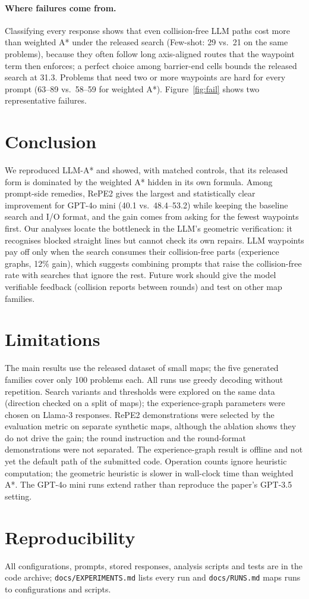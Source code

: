 \documentclass[11pt]{article}
\begin{document}
\paragraph{Where failures come from.}
Classifying every response shows that even collision-free LLM paths cost more than weighted A* under the released search (Few-shot: 29 vs.\ 21 on the same problems), because they often follow long axis-aligned routes that the waypoint term then enforces; a perfect choice among barrier-end cells bounds the released search at 31.3.
Problems that need two or more waypoints are hard for every prompt (63--89 vs.\ 58--59 for weighted A*).
Figure~\ref{fig:fail} shows two representative failures.

\section{Conclusion}
We reproduced LLM-A* and showed, with matched controls, that its released form is dominated by the weighted A* hidden in its own formula.
Among prompt-side remedies, RePE2 gives the largest and statistically clear improvement for GPT-4o mini (40.1 vs.\ 48.4--53.2) while keeping the baseline search and I/O format, and the gain comes from asking for the fewest waypoints first.
Our analyses locate the bottleneck in the LLM's geometric verification: it recognises blocked straight lines but cannot check its own repairs.
LLM waypoints pay off only when the search consumes their collision-free parts (experience graphs, 12\% gain), which suggests combining prompts that raise the collision-free rate with searches that ignore the rest.
Future work should give the model verifiable feedback (collision reports between rounds) and test on other map families.

\section*{Limitations}
The main results use the released dataset of small maps; the five generated families cover only 100 problems each. All runs use greedy decoding without repetition.
Search variants and thresholds were explored on the same data (direction checked on a split of maps); the experience-graph parameters were chosen on Llama-3 responses.
RePE2 demonstrations were selected by the evaluation metric on separate synthetic maps, although the ablation shows they do not drive the gain; the round instruction and the round-format demonstrations were not separated.
The experience-graph result is offline and not yet the default path of the submitted code.
Operation counts ignore heuristic computation; the geometric heuristic is slower in wall-clock time than weighted A*.
The GPT-4o mini runs extend rather than reproduce the paper's GPT-3.5 setting.



\appendix
\section{Reproducibility}
All configurations, prompts, stored responses, analysis scripts and tests are in the code archive; \texttt{docs/EXPERIMENTS.md} lists every run and \texttt{docs/RUNS.md} maps runs to configurations and scripts.
\end{document}
